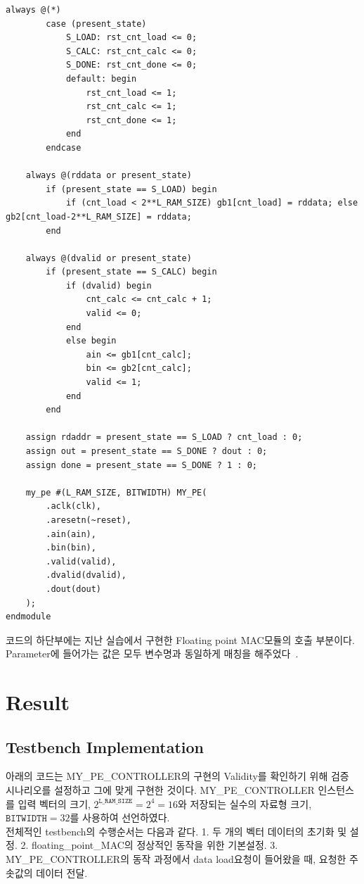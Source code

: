 \documentclass{article}
\begin{document}
\begin{lstlisting}[style={verilog-style}]
    always @(*)
        case (present_state)
            S_LOAD: rst_cnt_load <= 0;
            S_CALC: rst_cnt_calc <= 0;
            S_DONE: rst_cnt_done <= 0;
            default: begin
                rst_cnt_load <= 1; 
                rst_cnt_calc <= 1;
                rst_cnt_done <= 1;
            end
        endcase
        
    always @(rddata or present_state)
        if (present_state == S_LOAD) begin
            if (cnt_load < 2**L_RAM_SIZE) gb1[cnt_load] = rddata; else gb2[cnt_load-2**L_RAM_SIZE] = rddata;
        end
    
    always @(dvalid or present_state)
        if (present_state == S_CALC) begin
            if (dvalid) begin
                cnt_calc <= cnt_calc + 1;
                valid <= 0;
            end
            else begin
                ain <= gb1[cnt_calc];
                bin <= gb2[cnt_calc];
                valid <= 1;
            end
        end
    
    assign rdaddr = present_state == S_LOAD ? cnt_load : 0;
    assign out = present_state == S_DONE ? dout : 0;
    assign done = present_state == S_DONE ? 1 : 0;
    
    my_pe #(L_RAM_SIZE, BITWIDTH) MY_PE(
        .aclk(clk),
        .aresetn(~reset),
        .ain(ain),
        .bin(bin),
        .valid(valid),
        .dvalid(dvalid),
        .dout(dout)
    );
endmodule
\end{lstlisting}

코드의 하단부에는 지난 실습에서 구현한 Floating point MAC모듈의 호출 부분이다. Parameter에 들어가는 값은 모두 변수명과 동일하게 매칭을 해주었다~\cite{lab5, thomas2008verilog}.

\newpage
\section{Result}

\subsection{Testbench Implementation}
\label{sec:testbench}
아래의 코드는 MY\_PE\_CONTROLLER의 구현의 Validity를 확인하기 위해 검증 시나리오를 설정하고 그에 맞게 구현한 것이다. MY\_PE\_CONTROLLER 인스턴스를 입력 벡터의 크기, $2^\texttt{L\_RAM\_SIZE}= 2^4=16$와 저장되는 실수의 자료형 크기, $\texttt{BITWIDTH}=32$를 사용하여 선언하였다.\\
전체적인 testbench의 수행순서는 다음과 같다. 1. 두 개의 벡터 데이터의 초기화 및 설정. 2. floating\_point\_MAC의 정상적인 동작을 위한 기본설정. 3. MY\_PE\_CONTROLLER의 동작 과정에서 data load요청이 들어왔을 때, 요청한 주솟값의 데이터 전달.\\
\end{document}
